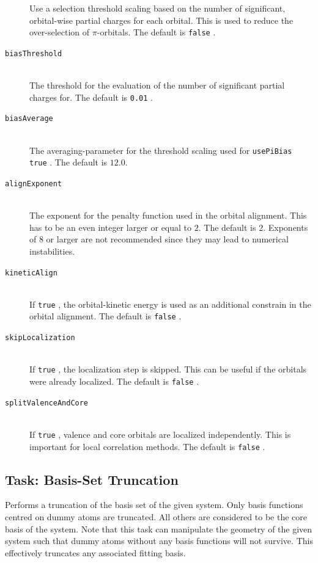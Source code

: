 \documentclass[bibliography=totocnumbered,a4paper,10pt,oneside]{scrbook}
\newcommand{\ttt}[1]{%
  \begingroup\setlength{\fboxsep}{1pt}%
  \colorbox{serenity-green!30}{\texttt{\hspace*{2pt}\vphantom{(g}#1\hspace*{2pt}}}%
  \endgroup
}
\begin{document}
\begin{description}
    Use a selection threshold scaling based on the number of significant, orbital-wise partial charges for
    each orbital. This is used to reduce the over-selection of $\pi$-orbitals. The default is \ttt{false}.
    \item [\texttt{biasThreshold}]\hfill \\
    The threshold for the evaluation of the number of significant partial charges for. The default is
    \ttt{0.01}.
    \item [\texttt{biasAverage}]\hfill \\
    The averaging-parameter for the threshold scaling used for \ttt{usePiBias true}.
    The default is $12.0$.
    \item [\texttt{alignExponent}]\hfill \\
    The exponent for the penalty function used in the orbital alignment. This has to be an even integer
    larger or equal to $2$. The default is $2$. Exponents of $8$ or larger are not recommended since they
    may lead to numerical instabilities.
    \item [\texttt{kineticAlign}]\hfill \\
    If \ttt{true}, the orbital-kinetic energy is used as an additional constrain in the orbital alignment.
    The default is \ttt{false}.
    \item [\texttt{skipLocalization}]\hfill \\
    If \ttt{true}, the localization step is skipped. This can be useful if the orbitals were already
    localized. The default is \ttt{false}.
    \item [\texttt{splitValenceAndCore}]\hfill \\
    If \ttt{true}, valence and core orbitals are localized independently. This is important for local
    correlation methods. The default is \ttt{false}.
 \end{description}


\subsection{Task: Basis-Set Truncation\label{task:truncation}}
Performs a truncation of the basis set of the given system. Only basis functions centred
on dummy atoms are truncated. All others are considered to be the core basis of the
system. Note that this task can manipulate the geometry of the given system such that 
dummy atoms without any basis functions will not survive. This effectively truncates any associated 
fitting basis.
\end{document}
